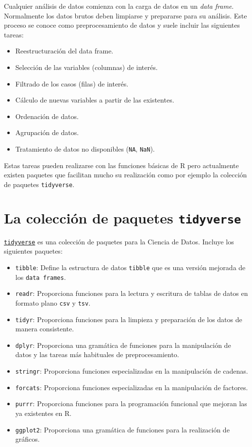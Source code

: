 \documentclass[
  a4paper,
]{scrreport}
\providecommand{\tightlist}{%
  \setlength{\itemsep}{0pt}\setlength{\parskip}{0pt}}\usepackage{longtable,booktabs,array}
\theoremstyle{definition}
\theoremstyle{definition}
\theoremstyle{remark}
\begin{document}
Cualquier análisis de datos comienza con la carga de datos en un
\emph{data frame}. Normalmente los datos brutos deben limpiarse y
prepararse para su análisis. Este proceso se conoce como
preprocesamiento de datos y suele incluir las siguientes tareas:

\begin{itemize}
\tightlist
\item
  Reestructuración del data frame.
\item
  Selección de las variables (columnas) de interés.
\item
  Filtrado de los casos (filas) de interés.
\item
  Cálculo de nuevas variables a partir de las existentes.
\item
  Ordenación de datos.
\item
  Agrupación de datos.
\item
  Tratamiento de datos no disponibles (\texttt{NA}, \texttt{NaN}).
\end{itemize}

Estas tareas pueden realizarse con las funciones básicas de R pero
actualmente existen paquetes que facilitan mucho su realización como por
ejemplo la colección de paquetes \texttt{tidyverse}.

\hypertarget{la-colecciuxf3n-de-paquetes-tidyverse}{%
\section{\texorpdfstring{La colección de paquetes
\texttt{tidyverse}}{La colección de paquetes tidyverse}}\label{la-colecciuxf3n-de-paquetes-tidyverse}}

\href{https://www.tidyverse.org/}{\texttt{tidyverse}} es una colección
de paquetes para la Ciencia de Datos. Incluye los siguientes paquetes:

\begin{itemize}
\tightlist
\item
  \texttt{tibble}: Define la estructura de datos \texttt{tibble} que es
  una versión mejorada de los \texttt{data\ frames}.
\item
  \texttt{readr}: Proporciona funciones para la lectura y escritura de
  tablas de datos en formato plano \texttt{csv} y \texttt{tsv}.
\item
  \texttt{tidyr}: Proporciona funciones para la limpieza y preparación
  de los datos de manera consistente.
\item
  \texttt{dplyr}: Proporciona una gramática de funciones para la
  manipulación de datos y las tareas más habituales de preprocesamiento.
\item
  \texttt{stringr}: Proporciona funciones especializadas en la
  manipulación de cadenas.
\item
  \texttt{forcats}: Proporciona funciones especializadas en la
  manipulación de factores.
\item
  \texttt{purrr}: Proporciona funciones para la programación funcional
  que mejoran las ya existentes en R.
\item
  \texttt{ggplot2}: Proporciona una gramática de funciones para la
  realización de gráficos.
\end{itemize}
\end{document}

